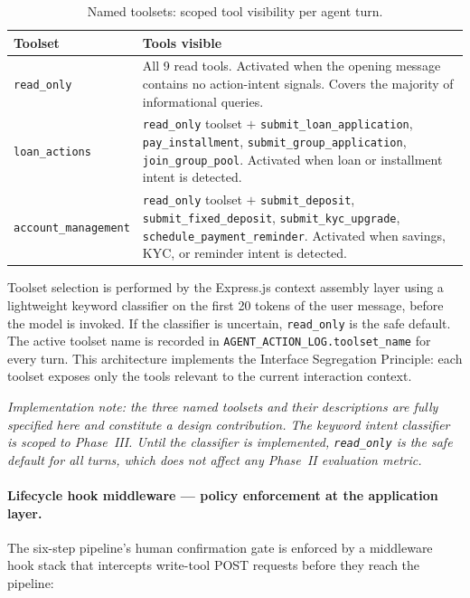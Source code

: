 \documentclass[12pt,a4paper]{report}
\begin{document}
\begin{table}[H]
\centering
\caption{Named toolsets: scoped tool visibility per agent turn.}
\label{tab:toolsets}
\small
\begin{tabular}{p{3.5cm}p{9cm}}
\hline
\textbf{Toolset} & \textbf{Tools visible} \\
\hline
\texttt{read\_only} & All 9 read tools. Activated when the opening message contains
no action-intent signals. Covers the majority of informational queries. \\
\texttt{loan\_actions} & \texttt{read\_only} toolset $+$ \texttt{submit\_loan\_application},
\texttt{pay\_installment}, \texttt{submit\_group\_application},
\texttt{join\_group\_pool}. Activated when loan or installment intent is detected. \\
\texttt{account\_management} & \texttt{read\_only} toolset $+$ \texttt{submit\_deposit},
\texttt{submit\_fixed\_deposit}, \texttt{submit\_kyc\_upgrade},
\texttt{schedule\_payment\_reminder}. Activated when savings, KYC, or reminder
intent is detected. \\
\hline
\end{tabular}
\end{table}

\noindent Toolset selection is performed by the Express.js context assembly layer
using a lightweight keyword classifier on the first 20 tokens of the user message,
before the model is invoked. If the classifier is uncertain, \texttt{read\_only}
is the safe default. The active toolset name is recorded in
\texttt{AGENT\_ACTION\_LOG.toolset\_name} for every turn. This architecture
implements the Interface Segregation Principle: each toolset exposes only the tools
relevant to the current interaction context.

\textit{Implementation note: the three named toolsets and their descriptions are
fully specified here and constitute a design contribution. The keyword intent
classifier is scoped to Phase~III. Until the classifier is implemented,
\texttt{read\_only} is the safe default for all turns, which does not affect any
Phase~II evaluation metric.}

\paragraph{Lifecycle hook middleware --- policy enforcement at the application layer.}

The six-step pipeline's human confirmation gate is enforced by a middleware hook
stack that intercepts write-tool POST requests before they reach the pipeline:
\end{document}
